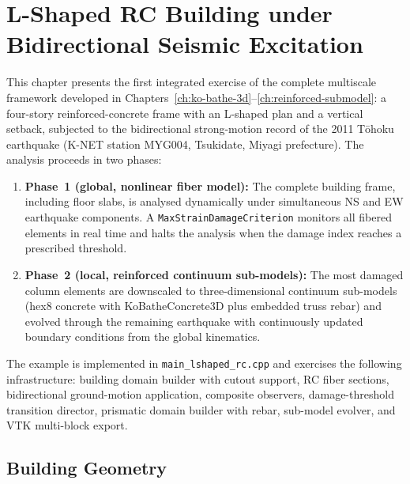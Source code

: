
\chapter{L-Shaped RC Building under Bidirectional Seismic Excitation}
\label{ch:lshaped-rc-building}

This chapter presents the first integrated exercise of the complete
multiscale framework developed in Chapters~\ref{ch:ko-bathe-3d}--\ref{ch:reinforced-submodel}:
a four-story reinforced-concrete frame with an L-shaped plan
and a vertical setback, subjected to the bidirectional strong-motion record
of the 2011 T\={o}hoku earthquake (K-NET station MYG004, Tsukidate, Miyagi prefecture).
The analysis proceeds in two phases:

\begin{enumerate}
  \item \textbf{Phase~1 (global, nonlinear fiber model):}
        The complete building frame, including floor slabs, is analysed
        dynamically under simultaneous NS and EW earthquake components.
        A \texttt{MaxStrainDamageCriterion} monitors all fibered elements
        in real time and halts the analysis when the damage index reaches
        a prescribed threshold.
  \item \textbf{Phase~2 (local, reinforced continuum sub-models):}
        The most damaged column elements are downscaled to three-dimensional
        continuum sub-models (hex8 concrete with KoBatheConcrete3D plus
        embedded truss rebar) and evolved through the remaining earthquake
        with continuously updated boundary conditions from the global kinematics.
\end{enumerate}

The example is implemented in \texttt{main\_lshaped\_rc.cpp} and
exercises the following infrastructure: building domain builder with
cutout support, RC fiber sections, bidirectional ground-motion
application, composite observers, damage-threshold transition director,
prismatic domain builder with rebar, sub-model evolver, and VTK
multi-block export.


\section{Building Geometry}
\label{sec:lshaped-geometry}

